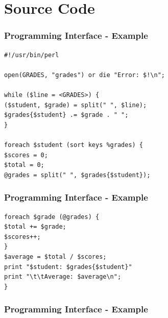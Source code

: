 \documentclass{beamer}
\begin{document}
\section{Source Code}
\begin{frame}[fragile]
\frametitle{Programming Interface - Example}
\begin{lstlisting}
#!/usr/bin/perl

open(GRADES, "grades") or die "Error: $!\n";

while ($line = <GRADES>) {
($student, $grade) = split(" ", $line);
$grades{$student} .= $grade . " ";
}

foreach $student (sort keys %grades) {
$scores = 0;
$total = 0;
@grades = split(" ", $grades{$student});
\end{lstlisting}
\end{frame}
\begin{frame}[fragile]
\frametitle{Programming Interface - Example}
\begin{lstlisting}
foreach $grade (@grades) {
$total += $grade;
$scores++;
}
$average = $total / $scores;
print "$student: $grades{$student}"
print "\t\tAverage: $average\n";
}
\end{lstlisting}
\end{frame}
\begin{frame}[fragile]
\frametitle{Programming Interface - Example}
\end{frame}
\end{document}
